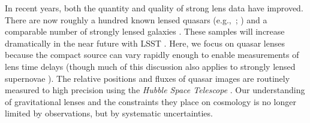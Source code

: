 In recent years, both the quantity and quality of strong lens data have improved. There are now roughly a hundred known lensed quasars (e.g.,\ ; \citealt{SQLS,CLASS}) and a comparable number of strongly lensed galaxies \citep[e.g.,][]{Bolton08,Cassowary}. These samples will increase dramatically in the near future with LSST \citep[e.g.,][]{LSST, Coe09, Oguri10, Collett15}. Here, we focus on quasar lenses because the compact source can vary rapidly enough to enable measurements of lens time delays (though much of this discussion also applies to strongly lensed supernovae \citealt{Kelly15}). The relative positions and fluxes of quasar images are routinely measured to high precision using the \textit{Hubble Space Telescope} \citep[e.g,.][and references therein; CASTLeS Collaboration]{Lehar00,Sluse12}. Our understanding of gravitational lenses and the constraints they place on cosmology is no longer limited by observations, but by systematic uncertainties. 
  
  
  